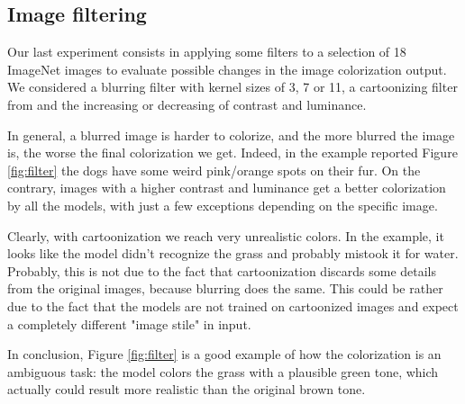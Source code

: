 \subsection{Image filtering}
Our last experiment consists in applying some filters to a selection of 18 ImageNet images to evaluate possible changes in the image colorization output. We considered a blurring filter with kernel sizes of 3, 7 or 11, a cartoonizing filter from \cite{cartoonize} and the increasing or decreasing of contrast and luminance.

In general, a blurred image is harder to colorize, and the more blurred the image is, the worse
the final colorization we get. Indeed, in the example reported Figure \ref{fig:filter} the dogs have some weird pink/orange
spots on their fur.
On the contrary, images with a higher contrast and luminance get a better colorization
by all the models, with just a few exceptions depending on the specific image.

Clearly, with cartoonization we reach very unrealistic colors. In the example, it looks like the model
didn't recognize the grass and probably mistook it for water. Probably, this is not due to the fact that cartoonization discards some details from the original images, because blurring does the same. This could be rather due to the fact that the models are not trained on cartoonized images and expect a completely different "image stile" in input. 

In conclusion, Figure \ref{fig:filter} is a good example of how the colorization is an ambiguous task: the model colors the grass with a plausible green tone, which actually could result more realistic than the original brown tone.

